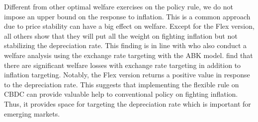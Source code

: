 \documentclass[12pt, a4paper]{article}
\begin{document}
Different from other optimal welfare exercises on the policy rule, we do not impose an upper bound on the response to inflation. This is a common approach due to price stability can have a big effect on welfare. Except for the Flex version, all others show that they will put all the weight on fighting inflation but not stabilizing the depreciation rate. This finding is in line with \citep{akinci2018exchange} who also conduct a welfare analysis using the exchange rate targeting with the ABK model. \citep{akinci2018exchange} find that there are significant welfare losses with exchange rate targeting in addition to inflation targeting. Notably, the Flex version returns a positive value in response to the depreciation rate. This suggests that implementing the flexible rule on CBDC can provide valuable help to conventional policy on fighting inflation. Thus, it provides space for targeting the depreciation rate which is important for emerging markets.
\end{document}
